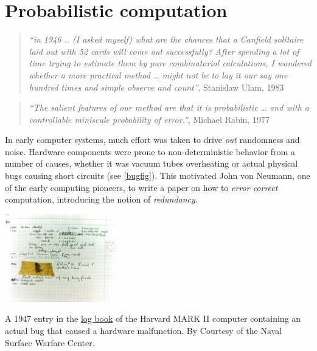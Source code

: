 \chapter{Probabilistic computation}\label{randomizedalgchap}


\begin{quote}
\emph{``in 1946 .. (I asked myself) what are the chances that a Canfield
solitaire laid out with 52 cards will come out successfully? After
spending a lot of time trying to estimate them by pure combinatorial
calculations, I wondered whether a more practical method \ldots{} might
not be to lay it our say one hundred times and simple observe and
count''}, Stanislaw Ulam, 1983
\end{quote}

\begin{quote}
\emph{``The salient features of our method are that it is probabilistic
\ldots{} and with a controllable miniscule probability of error.''},
Michael Rabin, 1977
\end{quote}

In early computer systems, much effort was taken to drive \emph{out}
randomness and noise. Hardware components were prone to
non-deterministic behavior from a number of causes, whether it was
vacuum tubes overheating or actual physical bugs causing short circuits
(see \cref{bugfig}). This motivated John von Neumann, one of the early
computing pioneers, to write a paper on how to \emph{error correct}
computation, introducing the notion of \emph{redundancy}.


\begin{marginfigure}
\centering
\includegraphics[width=\linewidth, height=1.5in, keepaspectratio]{../figure/bug.jpg}
\caption{A 1947 entry in the
\href{http://americanhistory.si.edu/collections/search/object/nmah_334663}{log
book} of the Harvard MARK II computer containing an actual bug that
caused a hardware malfunction. By Courtesy of the Naval Surface Warfare
Center.}
\label{bugfig}
\end{marginfigure}

